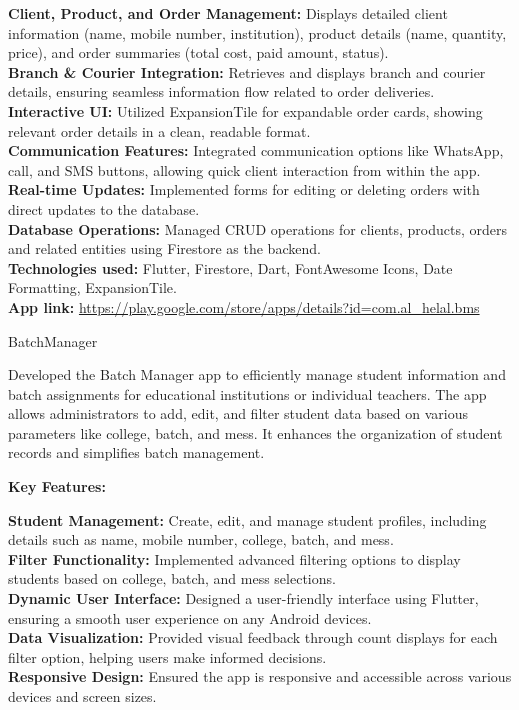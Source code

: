\documentclass[a4paper,12pt]{article}
\begin{document}
\begin{CV}
  \textbf{Client, Product, and Order Management:} Displays detailed client information (name, mobile number, institution), product details (name, quantity, price), and order summaries (total cost, paid amount, status).\\
  \textbf{Branch \& Courier Integration:} Retrieves and displays branch and courier details, ensuring seamless information flow related to order deliveries.\\
  \textbf{Interactive UI:} Utilized ExpansionTile for expandable order cards, showing relevant order details in a clean, readable format.\\
  \textbf{Communication Features:} Integrated communication options like WhatsApp, call, and SMS buttons, allowing quick client interaction from within the app.\\
  \textbf{Real-time Updates:} Implemented forms for editing or deleting orders with direct updates to the database.\\
  \textbf{Database Operations:} Managed CRUD operations for clients, products, orders and related entities using Firestore as the backend.\\
  \textbf{Technologies used:} Flutter, Firestore, Dart, FontAwesome Icons, Date Formatting, ExpansionTile.\\
  \textbf{App link:} \href{https://play.google.com/store/apps/details?id=com.al\_helal.bms}{https://play.google.com/store/apps/details?id=com.al\_helal.bms}
  \item[BatchManager] 

Developed the Batch Manager app to efficiently manage student information and batch assignments for educational institutions or individual teachers. The app allows administrators to add, edit, and filter student data based on various parameters like college, batch, and mess. It enhances the organization of student records and simplifies batch management.

\textbf{Key Features:}

\textbf{Student Management:} Create, edit, and manage student profiles, including details such as name, mobile number, college, batch, and mess.\\
\textbf{Filter Functionality:} Implemented advanced filtering options to display students based on college, batch, and mess selections.\\
\textbf{Dynamic User Interface:} Designed a user-friendly interface using Flutter, ensuring a smooth user experience on any Android devices.\\
\textbf{Data Visualization:} Provided visual feedback through count displays for each filter option, helping users make informed decisions.\\
\textbf{Responsive Design:} Ensured the app is responsive and accessible across various devices and screen sizes.\\\\


\end{CV}
\end{document}
